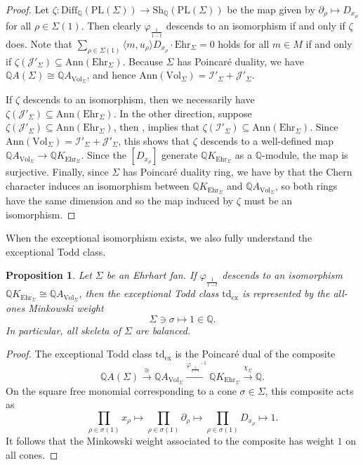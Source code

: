 \documentclass[oneside]{amsart}
\theoremstyle{plain}
\newtheorem{proposition}[theorem]{Proposition}
\theoremstyle{definition}
\newcommand{\Q}{{\mathbb{Q}}}
\newcommand{\Ann}{{\mathrm{Ann}}}
\newcommand{\Diff}{{\mathrm{Diff}}}
\newcommand{\Vol}{{\mathrm{Vol}}}
\newcommand{\Ehr}{{\mathrm{Ehr}}}
\newcommand{\Sh}{{\mathrm{Sh}}}
\newcommand{\ex}{{\mathrm{ex}}}
\newcommand{\td}{{\mathrm{td}}}
\newcommand{\PL}{{\mathrm{PL}}}
\newcommand{\mc}[1]{{\mathcal{#1}}}
\begin{document}
\begin{proof}
Let $\zeta: \Diff_\Q(\PL(\Sigma)) \to \Sh_\Q(\PL(\Sigma))$ be the map given by $\partial_\rho \mapsto D_{x_\rho}$ for all $\rho \in \Sigma(1)$. Then clearly $\varphi_{\frac{1}{1-t}}$ descends to an isomorphism if and only if $\zeta$ does.
Note that 
$\sum_{\rho\in\Sigma(1)} \langle m,u_\rho\rangle D_{x_\rho} \cdot \Ehr_\Sigma = 0$ holds for all $m\in M$
if and only if $\zeta(\mc J'_\Sigma) \subseteq \Ann(\Ehr_\Sigma)$. Because $\Sigma$ has Poincar\'e duality, we have $\Q A(\Sigma) \cong \Q A_{\Vol_\Sigma}$, and hence $\Ann(\Vol_\Sigma) = \mc I'_\Sigma + \mc J'_\Sigma$.

If $\zeta$ descends to an isomorphism, then we necessarily have $\zeta(\mc J'_\Sigma) \subseteq \Ann(\Ehr_\Sigma)$.
In the other direction, suppose  $\zeta(\mc J'_\Sigma) \subseteq \Ann(\Ehr_\Sigma)$, then 
, implies that $\zeta(\mc I'_\Sigma) \subseteq \Ann(\Ehr_\Sigma)$.
Since $\Ann(\Vol_\Sigma) = \mc I'_\Sigma + \mc J'_\Sigma$, this shows that $\zeta$ descends to a well-defined map
$\Q A_{\Vol_\Sigma} \to \Q K_{\Ehr_\Sigma}$. Since the $[D_{x_\rho}]$ generate $\Q K_{\Ehr_\Sigma}$ as a $\Q$-module, the map is surjective. Finally, since $\Sigma$ has Poincaré duality ring, we have by  that the Chern character induces an isomorphism between $\Q K_{\Ehr_\Sigma}$ and $\Q A_{\Vol_\Sigma}$, so both rings have the same dimension and so the map induced by $\zeta$ must be an isomorphism.
\end{proof}

When the exceptional isomorphism exists, we also fully understand the exceptional Todd class.

\begin{proposition}\label{prop:exceptional-implies-balanced}
Let $\Sigma$ be an Ehrhart fan. If 
$\varphi_{\frac{1}{1 - t}}$ descends to an isomorphism $\Q K_{\Ehr_\Sigma}\cong \Q A_{\Vol_\Sigma}$, then
the exceptional Todd class $\td_\ex$ is represented by the all-ones Minkowski weight 
\[
    \Sigma\ni \sigma\mapsto 1\in \Q .
\]
In particular, all skeleta of $\Sigma$ are balanced.
\end{proposition}

\begin{proof}
The exceptional Todd class $\td_\ex$ is the Poincar\'e dual of the composite
\[
    \Q A(\Sigma)\xrightarrow{\cong} \Q A_{\Vol_\Sigma}\xrightarrow{{\varphi_{\frac{1}{1 - t}}}^{-1}}\Q K_{\Ehr_\Sigma}\xrightarrow{\chi_\Sigma} \Q.
\]
On the square free monomial corresponding to a cone $\sigma\in\Sigma$, this composite acts as
\[
    \prod_{\rho\in\sigma(1)}x_\rho\mapsto\prod_{\rho\in\sigma(1)}\partial_\rho \mapsto \prod_{\rho\in\sigma(1)}D_{x_\rho}\mapsto 1.
\]
It follows that the Minkowski weight associated to the composite has weight $1$ on all cones.
\end{proof}
\end{document}
